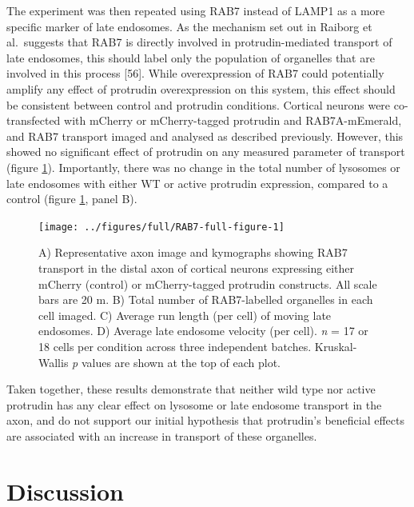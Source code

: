 \documentclass[
  12pt,
  a4paper,
]{book}
\begin{document}
The experiment was then repeated using RAB7 instead of LAMP1 as a more specific marker of late endosomes. As the mechanism set out in Raiborg et al.~suggests that RAB7 is directly involved in protrudin-mediated transport of late endosomes, this should label only the population of organelles that are involved in this process {[}56{]}. While overexpression of RAB7 could potentially amplify any effect of protrudin overexpression on this system, this effect should be consistent between control and protrudin conditions. Cortical neurons were co-transfected with mCherry or mCherry-tagged protrudin and RAB7A-mEmerald, and RAB7 transport imaged and analysed as described previously. However, this showed no significant effect of protrudin on any measured parameter of transport (figure \ref{fig:RAB7-full-figure}). Importantly, there was no change in the total number of lysosomes or late endosomes with either WT or active protrudin expression, compared to a control (figure \ref{fig:RAB7-full-figure}, panel B).



\begin{figure}
\texttt{[image: ../figures/full/RAB7-full-figure-1]} \caption[Protrudin effect on late endosome (RAB7) transport in the distal axon]{A) Representative axon image and kymographs showing RAB7 transport in the distal axon of cortical neurons expressing either mCherry (control) or mCherry-tagged protrudin constructs. All scale bars are 20 \textmu{}m. B) Total number of RAB7-labelled organelles in each cell imaged. C) Average run length (per cell) of moving late endosomes. D) Average late endosome velocity (per cell). \emph{n} = 17 or 18 cells per condition across three independent batches. Kruskal-Wallis \emph{p} values are shown at the top of each plot.}\label{fig:RAB7-full-figure}
\end{figure}

Taken together, these results demonstrate that neither wild type nor active protrudin has any clear effect on lysosome or late endosome transport in the axon, and do not support our initial hypothesis that protrudin's beneficial effects are associated with an increase in transport of these organelles.

\section{Discussion}\label{no-FYCO}
\end{document}
